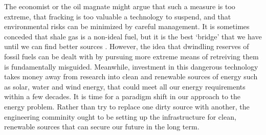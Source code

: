 \documentclass[12pt,letterpaper]{article}
\begin{document}
The economist or the oil magnate might argue that such a measure is too extreme, that fracking is too valuable a technology to suspend, and that environmental risks can be minimized by careful management. It is sometimes conceded that shale gas is a non-ideal fuel, but it is the best `bridge' that we have until we can find better sources \cite{bridge}. However, the idea that dwindling reserves of fossil fuels can be dealt with by pursuing more extreme means of retreiving them is fundamentally misguided. Meanwhile, investment in this dangerous technology takes money away from research into clean and renewable sources of energy such as solar, water and wind energy, that could meet all our energy requirements within a few decades\cite[58]{sciam}. It is time for a paradigm shift in our approach to the energy problem. Rather than try to replace one dirty source with another, the engineering comminity ought to be setting up the infrastructure for clean, renewable sources that can secure our future in the long term.


\makeworkscited
\end{document}
